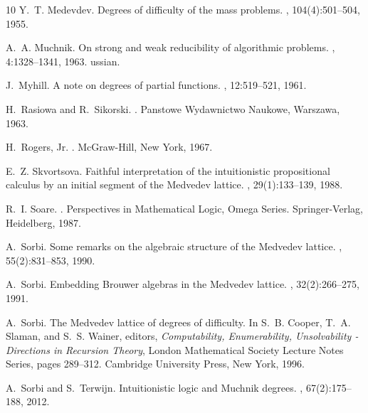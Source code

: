\documentclass[11pt]{amsart}
\begin{document}
\begin{thebibliography}{10}
 Y.~T. Medevdev. 
\newblock Degrees of difficulty of the mass problems.
, 104(4):501--504, 1955.

 A.~A. Muchnik. 
\newblock On strong and weak reducibility of algorithmic problems.
, 4:1328--1341, 1963.
ussian.

 J.~Myhill. 
\newblock A note on degrees of partial functions.
, 12:519--521, 1961.

 H.~Rasiowa and R.~Sikorski. 
.
\newblock Panstowe Wydawnictwo Naukowe, Warszawa, 1963.

 H.~Rogers, Jr. 
.
\newblock McGraw-Hill, New York, 1967.

 E.~Z. Skvortsova. 
\newblock Faithful interpretation of the intuitionistic propositional calculus
  by an initial segment of the {M}edvedev lattice.
, 29(1):133--139, 1988.

 R.~I. Soare. 
.
\newblock Perspectives in Mathematical Logic, Omega Series. Springer-Verlag,
  Heidelberg, 1987.

 A.~Sorbi. 
\newblock Some remarks on the algebraic structure of the {M}edvedev lattice.
, 55(2):831--853, 1990.

 A.~Sorbi. 
\newblock Embedding {B}rouwer algebras in the {M}edvedev lattice.
, 32(2):266--275, 1991.

 A.~Sorbi. 
\newblock The {M}edvedev lattice of degrees of difficulty.
\newblock In S.~B. Cooper, T.~A. Slaman, and S.~S. Wainer, editors, {\em
  Computability, Enumerability, Unsolvability - Directions in Recursion
  Theory}, London Mathematical Society Lecture Notes Series, pages 289--312.
  Cambridge University Press, New York, 1996.

 A.~Sorbi and S.~Terwijn. 
\newblock Intuitionistic logic and {M}uchnik degrees.
, 67(2):175--188, 2012.

\end{thebibliography}
\end{document}
